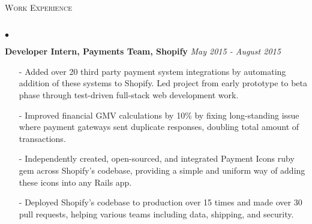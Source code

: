 \documentclass[10pt]{article}
\newcommand{\lineunder}{\vspace*{-8pt} \\ \hspace*{-18pt} \hrulefill \\}
\newcommand{\header}[1]{{\hspace*{-15pt}\vspace*{6pt} \textsc{#1}} \vspace*{-6pt} \lineunder }
\newenvironment{achievements}{\begin{list}{$\bullet$}{\topsep 0pt \itemsep -1.5pt \leftmargin 5pt}}{\vspace*{4pt}\end{list}}
\begin{document}
\header{\fontsize{11}{12}\selectfont  Work Experience}
\begin{achievements}
\item \textbf{Developer Intern, Payments Team, Shopify} \hfill \textit {May 2015 - August 2015}
\begin{itemize}
\item[-]Added over 20 third party payment system integrations by automating addition of these systems to Shopify. Led project from early prototype to beta phase through test-driven full-stack web development work.
\vspace{2pt}
\item[-]Improved financial GMV calculations by 10\% by fixing long-standing issue where payment gateways sent duplicate responses, doubling total amount of transactions. 
\vspace{2pt}
\item[-]Independently created, open-sourced, and integrated Payment Icons ruby gem across Shopify's codebase, providing a simple and uniform way of adding these icons into any Rails app.
\vspace{2pt}
\item[-]Deployed Shopify's codebase to production over 15 times and made over 30 pull requests, helping various teams including data, shipping, and security.
\end{itemize}
\end{achievements}

\vspace{8pt}
\end{document}

